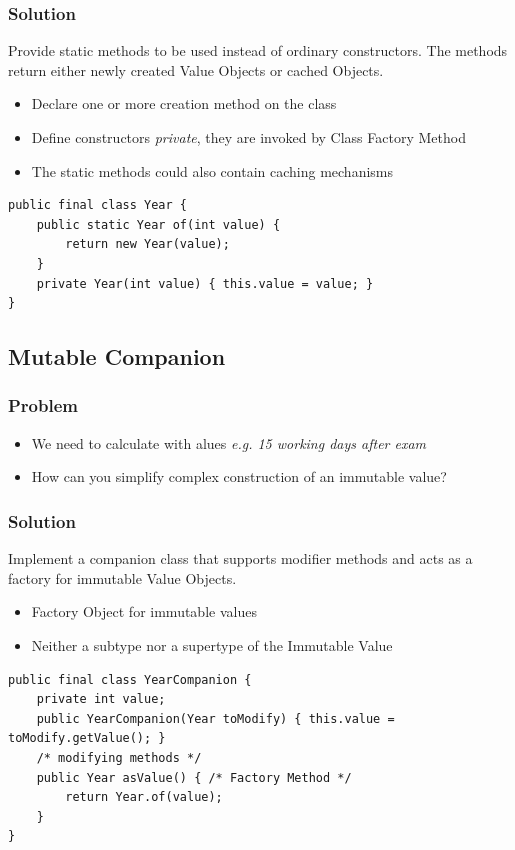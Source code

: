 \subsubsection{Solution}
Provide static methods to be used instead of ordinary constructors. The methods return either newly created Value Objects or cached Objects.
\begin{itemize}
    \item Declare one or more creation method on the class
    \item Define constructors \textit{private}, they are invoked by Class Factory Method
    \item The static methods could also contain caching mechanisms
\end{itemize}
\begin{lstlisting}
public final class Year {
    public static Year of(int value) {
        return new Year(value);
    }
    private Year(int value) { this.value = value; }
}
\end{lstlisting}

\subsection{Mutable Companion}
\subsubsection{Problem}
\begin{itemize}
    \item We need to calculate with alues \textit{e.g. 15 working days after exam}
    \item How can you simplify complex construction of an immutable value?
\end{itemize}
\subsubsection{Solution}
Implement a companion class that supports modifier methods and acts as a factory for immutable Value Objects.
\begin{itemize}
    \item Factory Object for immutable values
    \item Neither a subtype nor a supertype of the Immutable Value
\end{itemize}
\begin{lstlisting}
public final class YearCompanion {
    private int value;
    public YearCompanion(Year toModify) { this.value = toModify.getValue(); }
    /* modifying methods */
    public Year asValue() { /* Factory Method */
        return Year.of(value);
    }
}
\end{lstlisting}

